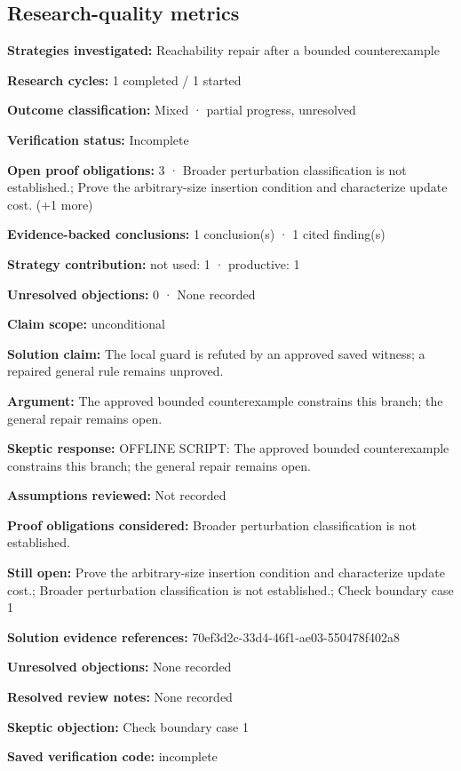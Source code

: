 \documentclass[11pt]{article}
\begin{document}
\subsection{Research-quality metrics}
\textbf{Strategies investigated:} Reachability repair after a bounded counterexample\par
\textbf{Research cycles:} 1 completed / 1 started\par
\textbf{Outcome classification:} Mixed · partial progress, unresolved\par
\textbf{Verification status:} Incomplete\par
\textbf{Open proof obligations:} 3 · Broader perturbation classification is not established.; Prove the arbitrary-size insertion condition and characterize update cost. (+1 more)\par
\textbf{Evidence-backed conclusions:} 1 conclusion(s) · 1 cited finding(s)\par
\textbf{Strategy contribution:} not used: 1 · productive: 1\par
\textbf{Unresolved objections:} 0 · None recorded\par
\textbf{Claim scope:} unconditional\par
\textbf{Solution claim:} The local guard is refuted by an approved saved witness; a repaired general rule remains unproved.\par
\textbf{Argument:} The approved bounded counterexample constrains this branch; the general repair remains open.\par
\textbf{Skeptic response:} OFFLINE SCRIPT: The approved bounded counterexample constrains this branch; the general repair remains open.\par
\textbf{Assumptions reviewed:} Not recorded\par
\textbf{Proof obligations considered:} Broader perturbation classification is not established.\par
\textbf{Still open:} Prove the arbitrary-size insertion condition and characterize update cost.; Broader perturbation classification is not established.; Check boundary case 1\par
\textbf{Solution evidence references:} 70ef3d2c-33d4-46f1-ae03-550478f402a8\par
\textbf{Unresolved objections:} None recorded\par
\textbf{Resolved review notes:} None recorded\par
\textbf{Skeptic objection:} Check boundary case 1\par
\textbf{Saved verification code:} incomplete\par
\end{document}
